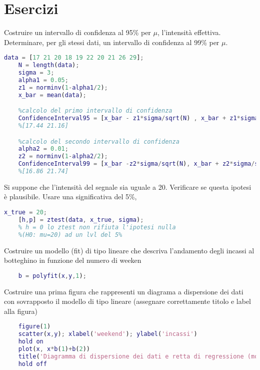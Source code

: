 \documentclass{article}
\begin{document}
\section{Esercizi}
Costruire un intervallo di confidenza al 95\% per $\mu$, l’intensità effettiva. Determinare, per
gli stessi dati, un intervallo di confidenza al 99\% per $\mu$.
\begin{lstlisting}[language=Matlab]
    data = [17 21 20 18 19 22 20 21 26 29];
    N = length(data);
    sigma = 3;
    alpha1 = 0.05;
    z1 = norminv(1-alpha1/2);
    x_bar = mean(data);

    %calcolo del primo intervallo di confidenza
    ConfidenceInterval95 = [x_bar - z1*sigma/sqrt(N) , x_bar + z1*sigma/sqrt(N)];
    %[17.44 21.16]

    %calcolo del secondo intervallo di confidenza
    alpha2 = 0.01;
    z2 = norminv(1-alpha2/2);
    ConfidenceInterval99 = [x_bar -z2*sigma/sqrt(N), x_bar + z2*sigma/sqrt(N)];
    %[16.86 21.74]
\end{lstlisting}

Si suppone che l'intensità del segnale sia uguale a 20. Verificare se questa ipotesi è plausibile. Usare una significativa del 5\%,
\begin{lstlisting}[language=Matlab]
    x_true = 20;
    [h,p] = ztest(data, x_true, sigma); 
    % h = 0 lo ztest non rifiuta l'ipotesi nulla 
    %(H0: mu=20) ad un lvl del 5%
\end{lstlisting}

Costruire un modello (fit) di tipo lineare che descriva l'andamento degli incassi al botteghino in funzione del numero di weeken
\begin{lstlisting}[language=Matlab]
    %linear fit: least squares regression methos
    b = polyfit(x,y,1);
\end{lstlisting}

Costruire una prima figura che rappresenti un diagrama a dispersione dei dati
con sovrapposto il modello di tipo lineare (assegnare correttamente titolo e label alla figura)

\begin{lstlisting}[language=Matlab]
    %diagramma di dispersone dei dati e visualizzazione del modello lineare
    figure(1)
    scatter(x,y); xlabel('weekend'); ylabel('incassi')
    hold on
    plot(x, x*b(1)+b(2))
    title('Diagramma di dispersione dei dati e retta di regressione (modello lineare y = beta_1 x + beta_2'))
    hold off
\end{lstlisting}
\end{document}
